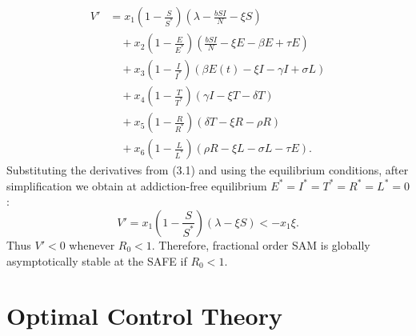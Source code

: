 \documentclass[10pt]{NSP1}
\begin{document}
	\begin{equation}
		\begin{aligned}
			V' &= x_1 \left(1 - \frac{S}{S^*}\right) \left( \lambda - \frac{b S I}{N} - \xi S \right) \\
			&\quad + x_2 \left(1 - \frac{E}{E^*}\right) \left( \frac{b S I}{N} - \xi E - \beta E + \tau E \right) \\
			&\quad + x_3 \left(1 - \frac{I}{I^*}\right) \left( \beta E(t) - \xi I - \gamma I + \sigma L \right) \\
			&\quad + x_4 \left(1 - \frac{T}{T^*}\right) \left( \gamma I - \xi T - \delta T \right) \\
			&\quad + x_5 \left(1 - \frac{R}{R^*}\right) \left( \delta T - \xi R - \rho R \right) \\
			&\quad + x_6 \left(1 - \frac{L}{L^*}\right) \left( \rho R - \xi L - \sigma L - \tau E \right).
		\end{aligned}
		\tag{4.12}
	\end{equation}
	Substituting the derivatives from (3.1) and using the equilibrium conditions, after simplification we obtain at addiction-free equilibrium $E^\ast = I^\ast = T^\ast = R^\ast = L^\ast = 0$:
	\begin{equation}
		V' = x_1 \left( 1 - \frac{S}{S^\ast} \right) (\lambda - \xi S) < - x_1 \xi.
		\tag{4.13}
	\end{equation}
	Thus $V' < 0$ whenever $R_0 < 1$. Therefore, fractional order SAM is globally asymptotically stable at the SAFE if $R_0 < 1$.
	
	\section{Optimal Control Theory}
	
\end{document}
